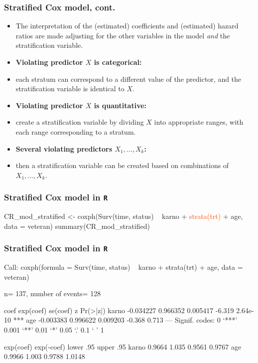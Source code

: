 \begin{frame}
\frametitle{Stratified Cox model, cont.}
\begin{itemize}
\item The interpretation of the (estimated) coefficients and (estimated) hazard ratios are made adjusting for the other variables in the model \textit{and} the stratification variable.

\item \textbf{Violating predictor $X$ is categorical:}
\item[]each stratum can correspond to a different value of the predictor, and the stratification variable is identical to $X$.

\item \textbf{Violating predictor $X$ is quantitative:}
\item[] create a stratification variable by dividing $X$ into appropriate ranges, with each range corresponding to a stratum.

\item \textbf{Several violating predictors $X_1, \ldots,X_k$:}
\item[] then a stratification variable can be created based on combinations of $X_1, \ldots,X_k$.
\end{itemize}
\end{frame}

\begin{frame}[fragile]
\frametitle{Stratified Cox model in \texttt{R}}
\begin{Rcode}{0.0}
CR_mod_stratified <-
    coxph(Surv(time, status) ~ karno + \textcolor{OrangeRed}{strata(trt)} + age,
          data = veteran)
summary(CR_mod_stratified)
\end{Rcode}
\end{frame}

\begin{frame}[fragile]
\frametitle{Stratified Cox model in \texttt{R}}
\begin{Rout}{-0.05}
Call:
coxph(formula = Surv(time, status) ~ karno + strata(trt) + age,
    data = veteran)

  n= 137, number of events= 128

           coef exp(coef)  se(coef)      z Pr(>|z|)
karno -0.034227  0.966352  0.005417 -6.319 2.64e-10 ***
age   -0.003383  0.996622  0.009203 -0.368    0.713
---
Signif. codes:  0 ‘***’ 0.001 ‘**’ 0.01 ‘*’ 0.05 ‘.’ 0.1 ‘ ’ 1

      exp(coef) exp(-coef) lower .95 upper .95
karno    0.9664      1.035    0.9561    0.9767
age      0.9966      1.003    0.9788    1.0148
\end{Rout}
\end{frame}

